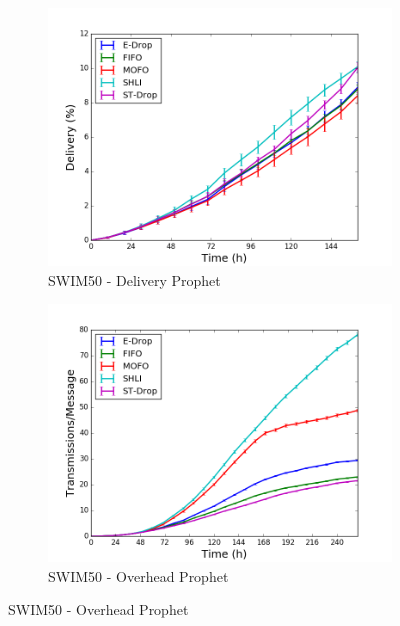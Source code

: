 \begin{figure}
    \begin{subfigure}[b]{0.5\columnwidth}
        \includegraphics[width=\linewidth]{imgs/swim/50/Prophet-delivery.png}
        \caption{SWIM50 - Delivery Prophet}
        \label{fig:swim50ProphetDel}
    \end{subfigure}
    \begin{subfigure}[b]{0.5\columnwidth}
        \includegraphics[width=\linewidth]{imgs/swim/50/Prophet-overhead.png}
        \caption{SWIM50 - Overhead Prophet}
        \label{fig:swim50ProphetOver}
    \end{subfigure}


\end{figure}
